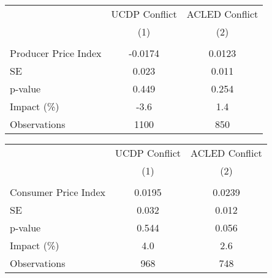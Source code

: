 {
\def\sym#1{\ifmmode^{#1}\else\(^{#1}\)\fi}
\begin{tabular}{l*{2}{c}}
\hline\hline
                    &\multicolumn{1}{c}{UCDP Conflict}&\multicolumn{1}{c}{ACLED Conflict}\\\cmidrule(lr){2-2}\cmidrule(lr){3-3}
                    &\multicolumn{1}{c}{(1)}         &\multicolumn{1}{c}{(2)}         \\
\hline
\hline
\\ Producer Price Index&     -0.0174         &      0.0123         \\
\hspace{15pt}  SE   &       0.023         &       0.011         \\
\hspace{15pt} p-value&       0.449         &       0.254         \\
\hspace{15pt} Impact (\%)&        -3.6         &         1.4         \\
Observations        &        1100         &         850         \\
\hline\hline
\end{tabular}
}
{
\def\sym#1{\ifmmode^{#1}\else\(^{#1}\)\fi}
\begin{tabular}{l*{2}{c}}
\hline\hline
                    &\multicolumn{1}{c}{UCDP Conflict}&\multicolumn{1}{c}{ACLED Conflict}\\\cmidrule(lr){2-2}\cmidrule(lr){3-3}
                    &\multicolumn{1}{c}{(1)}         &\multicolumn{1}{c}{(2)}         \\
\hline
\hline
\\ Consumer Price Index&      0.0195         &      0.0239         \\
\hspace{15pt}  SE   &       0.032         &       0.012         \\
\hspace{15pt} p-value&       0.544         &       0.056         \\
\hspace{15pt} Impact (\%)&         4.0         &         2.6         \\
Observations        &         968         &         748         \\
\hline\hline
\end{tabular}
}
